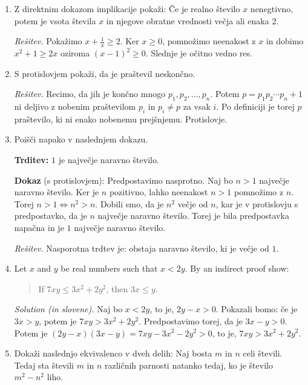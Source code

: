 \documentclass[11pt,paper=b5,footinclude,headinclude]{scrbook} %
\theoremstyle{remark}
\theoremstyle{definition} %
\theoremstyle{theorem} %
\begin{document}
\begin{enumerate}

\item Z direktnim dokazom implikacije pokaži: Če je realno število $x$ nenegtivno, potem je vsota  števila $x$  in njegove obratne vrednosti  večja ali enaka $2$.


\emph{ Rešitev.} Pokažimo $x + \frac{1}{x}\geq 2$. Ker $x\geq 0$, pomnožimo neenakost z $x$ in dobimo
$x^2 + 1 \geq 2x$ oziroma $(x- 1)^2\geq 0$. Slednje je očitno vedno res.

\item S protislovjem pokaži, da je praštevil neskončno.

\emph{ Rešitev.} Recimo, da jih je končno mnogo $p_1,p_2,\ldots, p_n$. Potem  $p=p_1p_2\cdots p_n+1$ ni deljivo z nobenim praštevilom $p_i$ in $p_i\neq p$ za vsak $i$. Po definiciji je torej $p$ praštevilo, ki ni enako nobenemu prejšnjemu. Protislovje.

\item Poišči napako v naslednjem dokazu. 

\textbf{Trditev:} $1$ je največje naravno število. 

\textbf{Dokaz} (s protislovjem):
Predpostavimo nasprotno. Naj bo $n>1$ največje naravno število. Ker je $n$ pozitivno, lahko neenakost $n>1$ pomnožimo z $n$. Torej $n>1\Leftrightarrow n^2>n$. Dobili smo, da je $n^2$ večje od $n$, kar je v protislovju s predpostavko, da je $n$ največje naravno število. Torej je bila predpostavka napačna in je $1$ največje naravno število.

\emph{ Rešitev.} Nasporotna trdtev je: obstaja naravno število, ki je večje od $1$.


\item Let  $x$ and $y$ be real numbers such that $x<2y$. 
By an indirect proof show: 
\begin{quote}
    If $7xy\leq 3x^2 + 2y^2$, then $3x\leq y$.
\end{quote}

\emph{ Solution (in slovene).} Naj bo $x<2y$, to je, $2y-x>0$. Pokazali bomo: če je $3x> y$, potem je $7xy > 3x^2 + 2y^2$. Predpostavimo torej, da je $3x-y>0$. Potem je $(2y-x)(3x-y)= 7xy - 3x^2 - 2y^2>0$, to je, $7xy > 3x^2 + 2y^2$.

\item Dokaži naslednjo ekvivalenco v dveh delih: Naj bosta $m$ in $n$ celi števili. Tedaj sta števili $m$ in $n$ različnih parnosti natanko tedaj, ko je število $m^2- n^2$ liho.


\end{enumerate}
\end{document}
